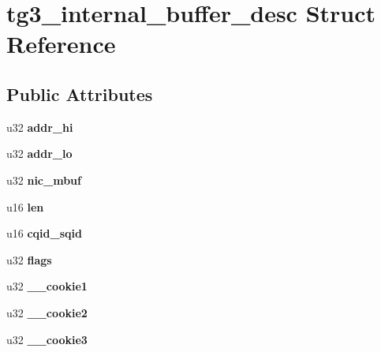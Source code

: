 \hypertarget{structtg3__internal__buffer__desc}{
\section{tg3\_\-internal\_\-buffer\_\-desc Struct Reference}
\label{structtg3__internal__buffer__desc}
}
\subsection*{Public Attributes}
\begin{DoxyCompactItemize}
\item 
\hypertarget{structtg3__internal__buffer__desc_a2c3eba00003724fba82800bedc4425fb}{
u32 {\bfseries addr\_\-hi}}
\label{structtg3__internal__buffer__desc_a2c3eba00003724fba82800bedc4425fb}

\item 
\hypertarget{structtg3__internal__buffer__desc_a181a6eed33de375a1d5bfb46636a0338}{
u32 {\bfseries addr\_\-lo}}
\label{structtg3__internal__buffer__desc_a181a6eed33de375a1d5bfb46636a0338}

\item 
\hypertarget{structtg3__internal__buffer__desc_a5312f6b865a14310456e87d6d0d51749}{
u32 {\bfseries nic\_\-mbuf}}
\label{structtg3__internal__buffer__desc_a5312f6b865a14310456e87d6d0d51749}

\item 
\hypertarget{structtg3__internal__buffer__desc_a7ab320086d2f5cf70269951098ee7ae1}{
u16 {\bfseries len}}
\label{structtg3__internal__buffer__desc_a7ab320086d2f5cf70269951098ee7ae1}

\item 
\hypertarget{structtg3__internal__buffer__desc_a488bec07cb2bb573eb3fa44fb4281b3f}{
u16 {\bfseries cqid\_\-sqid}}
\label{structtg3__internal__buffer__desc_a488bec07cb2bb573eb3fa44fb4281b3f}

\item 
\hypertarget{structtg3__internal__buffer__desc_a3d1e5397d97f7108f15d4418ebdf5de1}{
u32 {\bfseries flags}}
\label{structtg3__internal__buffer__desc_a3d1e5397d97f7108f15d4418ebdf5de1}

\item 
\hypertarget{structtg3__internal__buffer__desc_a66c9dab0e905948fc15ace186438e837}{
u32 {\bfseries \_\-\_\-cookie1}}
\label{structtg3__internal__buffer__desc_a66c9dab0e905948fc15ace186438e837}

\item 
\hypertarget{structtg3__internal__buffer__desc_a6bfd0fa023b0cbd7a7ec80f7c5f8aa19}{
u32 {\bfseries \_\-\_\-cookie2}}
\label{structtg3__internal__buffer__desc_a6bfd0fa023b0cbd7a7ec80f7c5f8aa19}

\item 
\hypertarget{structtg3__internal__buffer__desc_a01c1430ef77f5328f621bf2de9b05702}{
u32 {\bfseries \_\-\_\-cookie3}}
\label{structtg3__internal__buffer__desc_a01c1430ef77f5328f621bf2de9b05702}

\end{DoxyCompactItemize}


